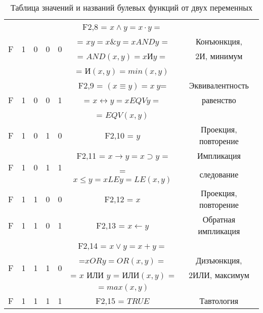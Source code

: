 \begin{table}[!h]
\begin{tabular}{|c|c|c|c|c|c|c|}
\hline
& & & & & F2,8 = $x \wedge y = x \cdot y =$ &  \\
\multirow{2}{*}{F} & \multirow{2}{*}{1} & \multirow{2}{*}{0} & \multirow{2}{*}{0} & \multirow{2}{*}{0} &  = $xy = x \& y = x AND y$ = & Конъюнкция,\\
& & & & & = $AND(x,y) = x $И$ y =$ & 2И, минимум \\
& & & & & = И$(x,y) = min(x,y)$	& \\
\hline
& & & & & F2,9 = $(x \equiv y) = x ~ y $= & Эквивалентность \\
F & 1 & 0 & 0 & 1 & = $x \leftrightarrow y = x EQV y = $ & равенство\\
& & & & & = $EQV(x,y)$ & \\
\hline
\multirow{1}{*}{F} & \multirow{1}{*}{1} & \multirow{1}{*}{0} & \multirow{1}{*}{1} & \multirow{1}{*}{0} & F2,10 = $y $  & Проекция, повторение\\
\hline
\multirow{2}{*}{F} & \multirow{2}{*}{1} & \multirow{2}{*}{0} & \multirow{2}{*}{1} & \multirow{2}{*}{1} & F2,11 = $x \to y = x  \supset y$ = & Импликация \\
& & & & &  = $x \le y = x LE y = LE(x,y)$ & следование  \\
\hline
\multirow{1}{*}{F} & \multirow{1}{*}{1} & \multirow{1}{*}{1} & \multirow{1}{*}{0} & \multirow{1}{*}{0} & F2,12 = $x $  & Проекция, повторение\\
\hline
\multirow{1}{*}{F} & \multirow{1}{*}{1} & \multirow{1}{*}{1} & \multirow{1}{*}{0} & \multirow{1}{*}{1} & F2,13 = $x \leftarrow y $  & Обратная импликация\\
\hline
& & & & & F2,14 = $x \vee y = x + y =$ &  \\
\multirow{2}{*}{F} & \multirow{2}{*}{1} & \multirow{2}{*}{1} & \multirow{2}{*}{1} & \multirow{2}{*}{0} & =$ x OR y = OR(x,y) = $ & Дизъюнкция,\\
& & & & & = $x$ ИЛИ $y$ = ИЛИ$(x,y)$ = & 2ИЛИ, максимум \\
& & & & & $ = max(x,y)$	& \\
\hline
\multirow{1}{*}{F} & \multirow{1}{*}{1} & \multirow{1}{*}{1} & \multirow{1}{*}{1} & \multirow{1}{*}{1} & F2,15 = $TRUE $  & Тавтология\\
\hline
\end{tabular}
\caption{Таблица значений и названий булевых функций от двух переменных}
\end{table}
